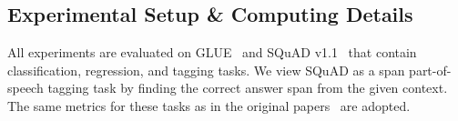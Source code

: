 \documentclass[11pt]{article}
\begin{document}
\begin{table}[h]
\centering
\caption{Network architectures of the teacher and student models used in the paper.}
\label{tab:teacher_student_architecture}
\end{table}

\subsection{Experimental Setup \& Computing Details}
\label{exps}
All experiments are evaluated on GLUE~\citep{wang2018glue} and SQuAD v1.1~\citep{rajpurkar2016squad} that contain classification, regression, and tagging tasks. We view SQuAD as a span part-of-speech tagging task by finding the correct answer span from the given context. The same metrics for these tasks as in the original papers~\citep{wang2018glue, rajpurkar2016squad} are adopted.
\end{document}
